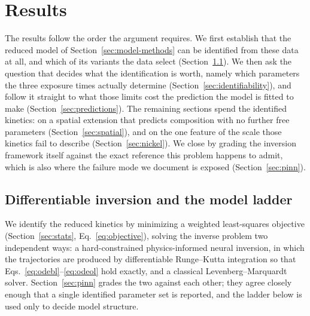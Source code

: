 \documentclass[a4paper,fleqn]{cas-sc}
\begin{document}
\section{Results}\label{sec:results}

The results follow the order the argument requires. We first establish
that the reduced model of Section~\ref{sec:model-methods} can be
identified from these data at all, and which of its variants the data
select (Section~\ref{sec:ladder}). We then ask the question that decides
what the identification is worth, namely which parameters the three
exposure times actually determine
(Section~\ref{sec:identifiability}), and follow it straight to what
those limits cost the prediction the model is fitted to make
(Section~\ref{sec:predictions}). The remaining sections spend the
identified kinetics: on a spatial extension that predicts composition
with no further free parameters (Section~\ref{sec:spatial}), and on the
one feature of the scale those kinetics fail to describe
(Section~\ref{sec:nickel}). We close by grading the inversion framework
itself against the exact reference this problem happens to admit, which
is also where the failure mode we document is exposed
(Section~\ref{sec:pinn}).

\subsection{Differentiable inversion and the model ladder}\label{sec:ladder}

We identify the reduced kinetics by minimizing a weighted least-squares
objective (Section~\ref{sec:stats}, Eq.~\eqref{eq:objective}), solving
the inverse problem two independent ways: a hard-constrained
physics-informed neural inversion, in which the trajectories are produced
by differentiable Runge--Kutta integration so that
Eqs.~\eqref{eq:odebl}--\eqref{eq:odeol} hold exactly, and a classical
Levenberg--Marquardt solver. Section~\ref{sec:pinn} grades the two
against each other; they agree closely enough that a single identified
parameter set is reported, and the ladder below is used only to decide
model structure.
\end{document}
